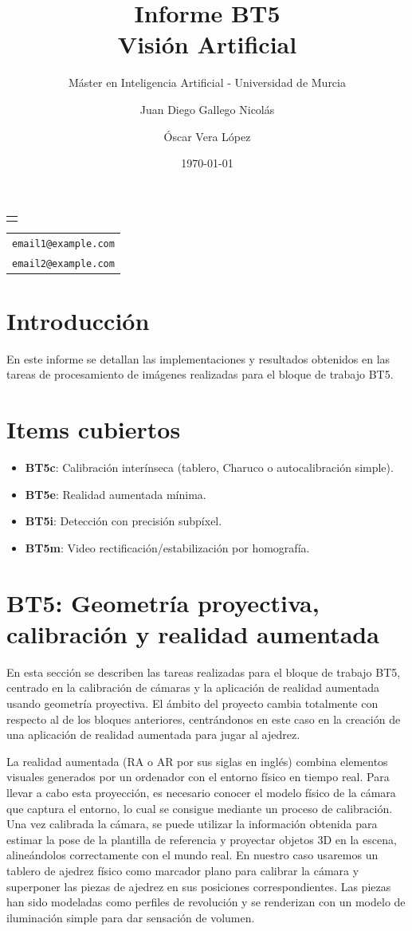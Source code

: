 \documentclass[11pt,a4paper]{article}
\subtitle{Máster en Inteligencia Artificial - Universidad de Murcia}
\makeatletter
\providecommand\@subtitle{}
\providecommand\@emailone{email1@example.com}
\providecommand\@emailtwo{email2@example.com}
\renewcommand{\maketitle}{%
    \begin{titlepage}
        \centering
        \thispagestyle{empty}
        \vspace*{2.5cm}
        {\Huge\bfseries\@title\par}
        \vspace{1cm}
        {\Large\itshape\@subtitle\par}
        \vspace{3cm}
        {\large
            \begin{tabular}{c}
                \@author
            \end{tabular}\par
        }
        \vspace{0.6cm}
        {\small
            \begin{tabular}{c}
                \texttt{\@emailone} \\[0.8ex]
                \texttt{\@emailtwo}
            \end{tabular}\par
        }
        \vfill
        {\large \@date\par}
    \end{titlepage}%
}
\makeatother
\begin{document}
\title{Informe BT5\\[1ex]\large Visión Artificial}
\author{Juan Diego Gallego Nicolás \and Óscar Vera López}
\date{\today}

\maketitle

\renewcommand{\contentsname}{Índice}
\setcounter{tocdepth}{3}
\tableofcontents
\clearpage


\section*{Introducción}
En este informe se detallan las implementaciones y resultados obtenidos en las tareas de procesamiento de imágenes realizadas para el bloque de trabajo BT5.

\section*{Items cubiertos}
\begin{itemize}
    \item \textbf{BT5c}: Calibración interínseca (tablero, Charuco o autocalibración simple).
    \item \textbf{BT5e}: Realidad aumentada mínima.
    \item \textbf{BT5i}: Detección con precisión subpíxel.
    \item \textbf{BT5m}: Video rectificación/estabilización por homografía.
\end{itemize}

\clearpage

\section{BT5: Geometría proyectiva, calibración y realidad aumentada}

En esta sección se describen las tareas realizadas para el bloque de trabajo BT5, centrado en la calibración de cámaras y la aplicación de realidad aumentada
usando geometría proyectiva. El ámbito del proyecto cambia totalmente con respecto al de los bloques anteriores, centrándonos en este caso en 
la creación de una aplicación de realidad aumentada para jugar al ajedrez.

La realidad aumentada (RA o AR por sus siglas en inglés) combina elementos visuales generados por un ordenador con el entorno físico en tiempo real.
Para llevar a cabo esta proyección, es necesario conocer el modelo físico de la cámara que captura el entorno, lo cual se consigue mediante un proceso de calibración.
Una vez calibrada la cámara, se puede utilizar la información obtenida para estimar la pose de la plantilla de referencia y proyectar objetos 3D en la escena, alineándolos correctamente con el mundo real.
En nuestro caso usaremos un tablero de ajedrez físico como marcador plano para calibrar la cámara y superponer las piezas de ajedrez en sus posiciones correspondientes.
Las piezas han sido modeladas como perfiles de revolución y se renderizan con un modelo de iluminación simple para dar sensación de volumen.
\end{document}

